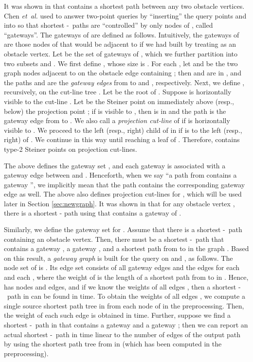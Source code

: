 \documentclass[english,runningheads,11pt]{llncs}
\def\etal{\textsl{et~al. }}
\def\st{-}
\begin{document}
It was shown in \cite{ref:ClarksonRe87,ref:ClarksonRe88} that
 contains a shortest path between any two obstacle vertices.
Chen \etal \cite{ref:ChenSh00} used  to answer two-point
queries by ``inserting'' the query points  and  into  so that shortest
\st\ paths are ``controlled'' by only  nodes of ,
called ``gateways''. The gateways of  are defined as follows.
Intuitively, the gateways of  are those nodes of  that would be
adjacent to  if we had built  by treating  as an obstacle vertex.
Let  be the set of gateways of , which we further
partition into two subsets  and
. We first define , whose size is
. For each , let 
and  be the two graph nodes adjacent to  on the obstacle edge
containing ; then  and  are in , and the
paths  and
 are the {\em gateway edges} from
 to  and , respectively. Next, we define
, recursively, on the cut-line tree .
Let  be the root of .
Suppose  is
horizontally visible to the cut-line . Let  be the Steiner point
on  immediately above (resp., below) the projection point ;
if  is visible to , then  is in 
and the path  is the gateway
edge from  to . We also call  a {\em projection cut-line}
of  if  is horizontally visible to .
We proceed to the left (resp., right) child of  in  if 
is to the left (resp., right) of .
We continue in this way until reaching a leaf of
. Therefore,  contains 
type-2 Steiner points on  projection cut-lines.

The above defines the gateway set , and each
gateway  is associated with a gateway edge between  and . Henceforth,
when we say ``a path from  contains a gateway '', we
implicitly mean that the path contains the corresponding gateway edge as well.
The above also defines  projection cut-lines for , which will
be used later in Section \ref{sec:newgraph}.
It was shown in \cite{ref:ChenSh00} that for any obstacle vertex ,
there is a shortest - path using  that contains a gateway of .

Similarly, we define the gateway set   for .
Assume that there is a shortest \st\ path containing an obstacle
vertex. Then, there must be a shortest \st\ path that contains a gateway
, a gateway , and a
shortest path from  to  in the graph  \cite{ref:ChenSh00}. Based on
this result, a {\em gateway graph}  is built for the query
on  and , as follows. The node
set of  is .
Its edge set consists of all gateway edges and the edges 
for each  and each ,
where the weight of   is the length of a shortest path
from  to  in . Hence,  has  nodes and
 edges, and if we know the weights of all edges ,
then a shortest \st\ path in  can be found in
 time. To obtain the weights of all edges , we
compute a single source shortest path tree in  from each node of 
in the preprocessing. Then, the weight of each such edge 
is obtained in  time. Further, suppose we find a shortest
\st\ path in  that contains a gateway  and a gateway ; then we can
report an actual shortest \st\ path in time linear to the
number of edges of the output path by using the shortest path tree from 
in  (which has been computed in the preprocessing).
\end{document}
